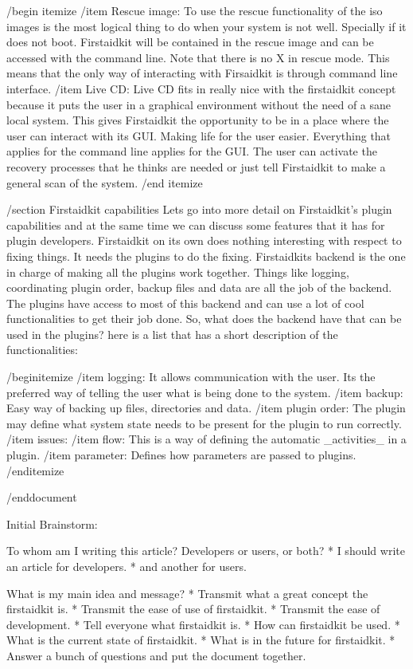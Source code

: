 /begin{ itemize }
/item Rescue image:
To use the rescue functionality of the iso images is the most logical thing to do when your system is not well.  Specially if it does not boot.  Firstaidkit will be contained in the rescue image and can be accessed with the command line.  Note that there is no X in rescue mode.  This means that the only way of interacting with Firsaidkit is through command line interface.
/item Live CD:
Live CD fits in really nice with the firstaidkit concept because it puts the user in a graphical environment without the need of a sane local system.  This gives Firstaidkit the opportunity to be in a place where the user can interact with its GUI.  Making life for the user easier.  Everything that applies for the command line applies for the GUI.  The user can activate the recovery processes that he thinks are needed or just tell Firstaidkit to make a general scan of the system.
/end { itemize }

/section{ Firstaidkit capabilities }
Lets go into more detail on Firstaidkit's plugin capabilities and at the same time we can discuss some features that it has for plugin developers.  Firstaidkit on its own does nothing interesting with respect to fixing things.  It needs the plugins to do the fixing.  Firstaidkits backend is the one in charge of making all the plugins work together.  Things like logging, coordinating plugin order, backup files and data are all the job of the backend.  The plugins have access to most of this backend and can use a lot of cool functionalities to get their job done.  So, what does the backend have that can be used in the plugins?  here is a list that has a short description of the functionalities:

/begin{itemize}
/item logging: It allows communication with the user.  Its the preferred way of telling the user what is being done to the system.
/item backup: Easy way of backing up files, directories and data.
/item plugin order: The plugin may define what system state needs to be present for the plugin to run correctly.
/item issues:
/item flow: This is a way of defining the automatic _activities_ in a plugin.
/item parameter: Defines how parameters are passed to plugins.
/end{itemize}

/end{document}

Initial Brainstorm:

To whom am I writing this article?  Developers or users, or both?
 * I should write an article for developers.
 * and another for users.

What is my main idea and message?
 * Transmit what a great concept the firstaidkit is.
 * Transmit the ease of use of firstaidkit.
 * Transmit the ease of development.
 * Tell everyone what firstaidkit is.
 * How can firstaidkit be used.
 * What is the current state of firstaidkit.
 * What is in the future for firstaidkit.
 * Answer a bunch of questions and put the document together.

